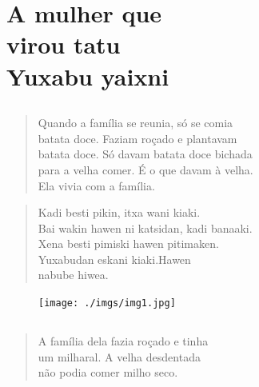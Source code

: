 \openany


\blankpage
\part[A mulher que virou tatu]{A mulher que\\ virou tatu\\Yuxabu yaixni}

\chapter*{}

\mbox{}\vspace*{\fill}

\begin{verse}
Quando a família se reunia, só se comia\\
batata doce. Faziam roçado e plantavam\\
batata doce. Só davam batata doce bichada\\
para a velha comer. É o que davam à velha.\\
Ela vivia com a família.
\end{verse}

\begin{verse}
Kadi besti pikin, itxa wani kiaki.\\
Bai wakin hawen ni katsidan, kadi banaaki.\\
Xena besti pimiski hawen pitimaken.\\
Yuxabudan eskani kiaki.Hawen\\
nabube hiwea.
\end{verse}

\vspace*{\fill}

\pagebreak
\thispagestyle{empty}
\begin{figure}
\vspace*{-1.6cm}
\hspace*{-2.2cm}\texttt{[image: ./imgs/img1.jpg]}
\end{figure}

\chapter*{}

\mbox{}\vspace*{\fill}

\begin{verse}
A família dela fazia roçado e tinha\\
um milharal. A velha desdentada\\
não podia comer milho seco.
\end{verse}

